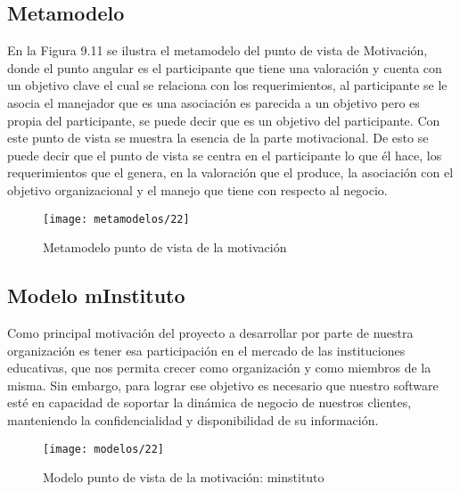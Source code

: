    \subsection{Metamodelo}
   En la Figura 9.11 se ilustra el metamodelo del punto de vista de Motivación, donde el punto angular es el participante que tiene una valoración y cuenta con un objetivo clave el cual se relaciona con los requerimientos, al participante se le asocia el manejador que es una asociación es parecida a un objetivo pero es propia del participante, se puede decir que es un objetivo del participante. Con este punto de vista se muestra la esencia de la parte motivacional. De esto se puede decir que el punto de vista se centra en el participante lo que él hace, los requerimientos que el genera, en la valoración que el produce, la asociación con el objetivo organizacional y el manejo que tiene con respecto al negocio.
   
   \begin{figure}[H]
   	\centering
   	\texttt{[image: metamodelos/22]}
   	\captionsetup{width=.95\textwidth}
   	\caption{Metamodelo punto de vista de la motivación}
   	\label{metamodelo22}
   \end{figure}
   
   \subsection{Modelo mInstituto}
   Como principal motivación del proyecto a desarrollar por parte de nuestra organización es tener esa participación en el mercado de las instituciones educativas, que nos permita crecer como organización y como miembros de la misma. Sin embargo, para lograr ese objetivo es necesario que nuestro software esté en capacidad de soportar la dinámica de negocio de nuestros clientes, manteniendo la confidencialidad y disponibilidad de su información.
   
   \begin{figure}[H]
   	\centering
   	\texttt{[image: modelos/22]}
   	\captionsetup{width=.95\textwidth}
   	\caption{Modelo punto de vista de la motivación: minstituto}
   	\label{modelo22}
   \end{figure}
